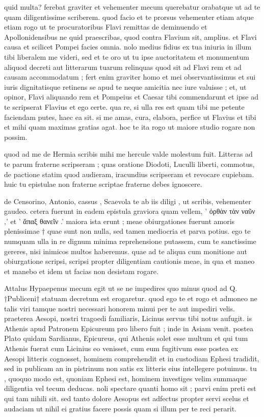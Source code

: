  quid multa? ferebat graviter et vehementer mecum querebatur orabatque ut ad te quam diligentissime scriberem. quod facio et te prorsus vehementer etiam atque etiam rogo ut te procuratoribus Flavi remittas de deminuendo et Apollonidensibus ne quid praescribas, quod contra Flavium sit, amplius. et Flavi causa et scilicet Pompei facies omnia. nolo medius fidius ex tua iniuria in illum tibi liberalem me videri, sed et te oro ut tu ipse auctoritatem et monumentum aliquod decreti aut litterarum tuarum relinquas quod sit ad Flavi rem et ad causam accommodatum ; fert enim graviter homo et mei observantissimus et sui iuris dignitatisque retinens se apud te neque amicitia nec iure valuisse ; et, ut opinor, Flavi aliquando rem et Pompeius et Caesar tibi commendarunt et ipse ad te scripserat Flavius et ego certe. qua re, si ulla res est quam tibi me petente faciendam putes, haec ea sit. si me amas, cura, elabora, perfice ut Flavius et tibi et mihi quam maximas gratias agat. hoc te ita rogo ut maiore studio rogare non possim.

 quod ad me de Hermia scribis mihi me hercule valde molestum fuit. Litteras ad te parum fraterne scripseram ; quas oratione Diodoti, Luculli liberti, commotus, de pactione statim quod audieram, iracundius scripseram et revocare cupiebam. huic tu epistulae non fraterne scriptae fraterne debes ignoscere.

 de Censorino, Antonio, cassus , Scaevola te ab iis diligi , ut scribis, vehementer gaudeo. cetera fuerunt in eadem epistula graviora quam vellem, ' ὀρθὰν τὰν ναῦν ,' et ' ἅπαξ θανεῖν .' maiora ista erunt ; meae obiurgationes fuerunt amoris plenissimae † quae sunt non nulla, sed tamen mediocria et parva potius. ego te numquam ulla in re dignum minima reprehensione putassem, cum te sanctissime gereres, nisi inimicos multos haberemus. quae ad te aliqua cum monitione aut obiurgatione scripsi, scripsi propter diligentiam cautionis meae, in qua et maneo et manebo et idem ut facias non desistam rogare.

 Attalus Hypaepenus mecum egit ut se ne impedires quo minus quod ad Q. †Publiceni† statuam decretum est erogaretur. quod ego te et rogo et admoneo ne talis viri tamque nostri necessari honorem minui per te aut impediri velis. praeterea Aesopi, nostri tragoedi familiaris, Licinus servus tibi notus aufugit. is Athenis apud Patronem Epicureum pro libero fuit ; inde in Asiam venit. postea Plato quidam Sardianus, Epicureus, qui Athenis solet esse multum et qui tum Athenis fuerat cum Licinius eo venisset, cum eum fugitivum esse postea ex Aesopi litteris cognosset, hominem comprehendit et in custodiam Ephesi tradidit, sed in publicam an in pistrinum non satis ex litteris eius intellegere potuimus. tu , quoquo modo est, quoniam Ephesi est, hominem investiges velim summaque diligentia vel tecum deducas. noli spectare quanti homo sit ; parvi enim preti est qui tam nihili sit. sed tanto dolore Aesopus est adfectus propter servi scelus et audaciam ut nihil ei gratius facere possis quam si illum per te reci perarit.


